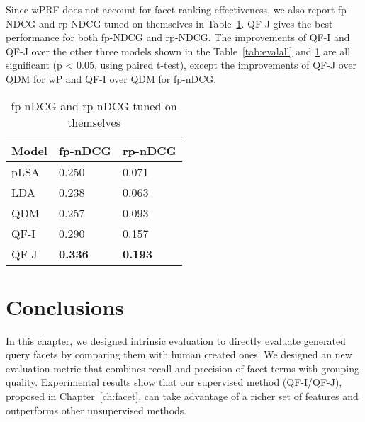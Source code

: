 Since wPRF does not account for facet ranking effectiveness, we also report fp-NDCG and rp-NDCG tuned on themselves in Table~\ref{tab:evalallrank}. QF-J gives the best performance for both fp-NDCG and rp-NDCG.
The improvements of QF-I and QF-J over the other three models shown in the Table~\ref{tab:evalall} and \ref{tab:evalallrank} are all significant (p < 0.05, using paired t-test), except the improvements of QF-J over QDM for wP and QF-I over QDM for fp-nDCG.
\begin{table}[ht!]
\centering
\caption{fp-nDCG and rp-nDCG tuned on themselves}
\label{tab:evalallrank}
\begin{tabular}{|l|l|l|} \hline
Model &  fp-nDCG & rp-nDCG\\\hline
pLSA & 0.250 & 0.071\\
LDA &  0.238 & 0.063 \\
QDM & 0.257 & 0.093  \\
QF-I & 0.290 & 0.157\\
QF-J & \textbf{0.336} & \textbf{0.193}\\\hline
\end{tabular}
\end{table}

\section{Conclusions} \label{sec:ie-conclusions}
In this chapter, we designed intrinsic evaluation to directly evaluate generated query facets by comparing them with human created ones. We designed an new evaluation metric that combines recall and precision of facet terms with grouping quality. Experimental results show that our supervised method (QF-I/QF-J), proposed in Chapter~\ref{ch:facet}, can take advantage of a richer set of features and outperforms other unsupervised methods.
